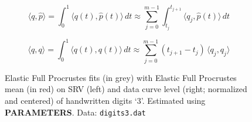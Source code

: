 $$ \langle q, \hat{p} \rangle = \int_0^1 \langle q(t), \hat{p}(t) \rangle \, dt \approx \sum_{j=0}^{m-1} \int_{t_j}^{t_{j+1}} \langle q_j, \hat{p}(t) \rangle \, dt $$

$$ \langle q, q \rangle = \int_0^1 \langle q(t), q(t) \rangle \, dt \approx \sum_{j=0}^{m-1} (t_{j+1} - t_j) \, \langle q_j, q_j \rangle $$

\begin{figure}
  \centering
  \begin{subfigure}{.48\textwidth}
    \centering
  \end{subfigure}\hfill%
  \begin{subfigure}{.48\textwidth}
    \centering
  \end{subfigure}
  \caption{Elastic Full Procrustes fits (in grey) with Elastic Full Procrustes mean (in red) on SRV (left) and data curve level (right; normalized and centered) of handwritten digits \enquote*{3}. Estimated using \textbf{PARAMETERS}. Data: \texttt{digits3.dat}}
  \label{fig:3-pfits}
\end{figure}
